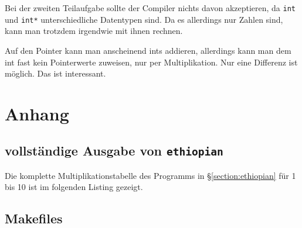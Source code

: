 Bei der zweiten Teilaufgabe sollte der Compiler nichts davon akzeptieren, da \texttt{int} und \texttt{int*} unterschiedliche Datentypen sind. Da es allerdings nur Zahlen sind, kann man trotzdem irgendwie mit ihnen rechnen.

Auf den Pointer kann man anscheinend ints addieren, allerdings kann man dem int fast kein Pointerwerte zuweisen, nur per Multiplikation. Nur eine Differenz ist möglich. Das ist interessant.

\chapter{Anhang}


\section{vollständige Ausgabe von \texttt{ethiopian}}

Die komplette Multiplikationstabelle des Programms in §\ref{section:ethiopian} für 1 bis 10 ist im folgenden Listing gezeigt.


\section{Makefiles}





